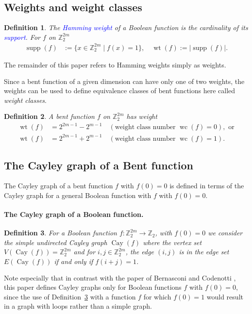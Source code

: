 \documentclass[12pt,a4paper]{article}
\newcommand{\mb}[1]{\mathbb{#1}}
\newcommand{\Z}{\mb{Z}}
\newcommand{\abs}[1]{\left| #1 \right|}
\newcommand{\To}{\rightarrow}
\newcommand{\Emph}[1]{\emph{\textcolor{blue}{#1}}}
\newcommand{\Cay}[1]{\operatorname{Cay}\left(#1\right)}
\newcommand{\support}[1]{\operatorname{supp}\left(#1\right)}
\newcommand{\weight}[1]{\operatorname{wt}\left(#1\right)}
\newcommand{\weightclass}[1]{\operatorname{wc}\left(#1\right)}
\newtheorem{Definition}{Definition}
\begin{document}
\subsection{Weights and weight classes}
\begin{Definition}
\label{def-weight}
The \Emph{Hamming weight} of a Boolean function is the cardinality of its \Emph{support}.
For $f$ on $\Z_2^{2m}$
\begin{align*}
\support{f} &:= \{x \in \Z_2^{2m} \mid f(x)=1 \}, \quad \weight{f} := \abs{ \support{f} }.
\end{align*}
\end{Definition}

The remainder of this paper refers to Hamming weights simply as weights.

Since a bent function of a given dimension can have only one of two weights,
the weights can be used to define equivalence classes of bent functions %
here called \emph{weight classes}.
\begin{Definition}
\label{def-weight-class}
A bent function $f$ on $\Z_2^{2m}$ has weight \cite[Theorem 6.2.10]{Dil74}
\begin{align*}
\weight{f} &= 2^{2 m - 1} - 2^{m-1} \quad (\text{weight class number~} \weightclass{f}=0),
\text{~or}
\\
\weight{f} &= 2^{2 m - 1} + 2^{m-1} \quad (\text{weight class number~} \weightclass{f}=1).
\end{align*}
\end{Definition}

%
%

\subsection{The Cayley graph of a Bent function}

The Cayley graph of a bent function $f$ with $f(0)=0$ is defined
in terms of the Cayley graph for a general Boolean function with $f$ with $f(0)=0$.
\paragraph*{The Cayley graph of a Boolean function.}
\begin{Definition}
\label{def-Cayley-graph}
For a Boolean function $f : \Z_2^{2 m} \To \Z_2$, with $f(0)=0$ we consider the simple undirected
\emph{Cayley graph} $\Cay{f}$  \cite[3.1]{BerC99}
where the vertex set $V(\Cay{f}) = \Z_2^{2 m}$ and for $i,j \in \Z_2^{2 m}$, the edge $(i,j)$ is in
the edge set $E(\Cay{f})$ if and only if $f(i+j)=1$.
\end{Definition}
Note especially that in contrast with the paper of Bernasconi and Codenotti \cite{BerC99},
this paper defines Cayley graphs only for Boolean functions $f$ with $f(0)=0$,
since the use of Definition~\ref{def-Cayley-graph} with a function $f$ for which $f(0)=1$ would
result in a graph with loops rather than a simple graph.
\end{document}
